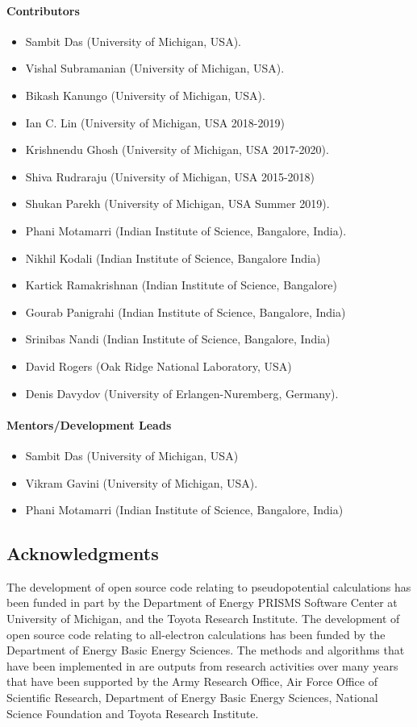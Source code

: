 \paragraph{Contributors}
\begin{itemize}
	\item Sambit Das (University of Michigan, USA).
	\item Vishal Subramanian (University of Michigan, USA).
	\item Bikash Kanungo (University of Michigan, USA).
 \item Ian C. Lin (University of Michigan, USA 2018-2019)
 \item Krishnendu Ghosh (University of Michigan, USA 2017-2020).
 \item Shiva Rudraraju (University of Michigan, USA 2015-2018)
 \item Shukan Parekh (University of Michigan, USA Summer 2019).
\item Phani Motamarri (Indian Institute of Science, Bangalore, India).
\item Nikhil Kodali (Indian Institute of Science, Bangalore India)
\item Kartick Ramakrishnan (Indian Institute of Science, Bangalore)
\item Gourab Panigrahi (Indian Institute of Science, Bangalore, India)
\item Srinibas Nandi (Indian Institute of Science, Bangalore, India)
\item David Rogers (Oak Ridge National Laboratory, USA)
\item Denis Davydov (University of Erlangen-Nuremberg, Germany). 	
	
\end{itemize}

\paragraph{Mentors/Development Leads}
\begin{itemize}
    \item Sambit Das (University of Michigan, USA)    
     \item Vikram Gavini (University of Michigan, USA).
     \item Phani Motamarri (Indian Institute of Science, Bangalore, India)
\end{itemize}

\subsection{Acknowledgments}
The development of \dftfe{} open source code relating to pseudopotential calculations has been funded in part by the Department 
of Energy PRISMS Software Center at University of Michigan, and the Toyota Research Institute. The development of \dftfe{} open 
source code relating to all-electron calculations has been funded by the Department of Energy Basic Energy Sciences. The methods 
and algorithms that have been implemented in \dftfe{} are outputs from research activities over many years that have been 
supported by the Army Research Office, Air Force Office of Scientific Research, Department of Energy Basic Energy Sciences, 
National Science Foundation and Toyota Research Institute. 

